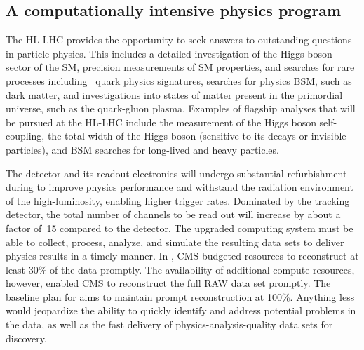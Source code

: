 
\subsection{A computationally intensive physics program}

The \gls{HL-LHC} provides the opportunity to seek answers to outstanding questions in particle physics. This includes a detailed investigation of the Higgs boson sector of the \gls{SM}, precision measurements of \gls{SM} properties, and searches for rare processes including \cPqb\ quark physics signatures, searches for physics \gls{BSM}, such as dark matter, and investigations into states of matter present in the primordial universe, such as the quark-gluon plasma.  
Examples of flagship analyses that will be pursued at the \gls{HL-LHC} include the measurement of the Higgs boson self-coupling, the total width of the Higgs boson  (sensitive to its decays or invisible particles), and \gls{BSM} searches for long-lived and heavy particles. 

The detector and its readout electronics will undergo substantial refurbishment during \LSThree to improve physics performance and withstand the radiation environment of the high-luminosity, enabling higher trigger rates.
Dominated by the tracking detector, the total number of channels to be read out will increase by about a factor of~15 compared to the \PhaseOne detector.
The upgraded computing system must be able to collect, process, analyze, and simulate the resulting data sets to deliver physics results in a timely manner.
In \RunThree, CMS budgeted resources to reconstruct at least 30\% of the data promptly. The availability of additional compute resources, however, enabled CMS to reconstruct the full \gls{RAW} data set promptly. The baseline plan for \PhaseTwo aims to maintain prompt reconstruction at 100\%. Anything less would jeopardize the ability to quickly identify and address potential problems in the data, as well as the fast delivery of physics-analysis-quality data sets for discovery.

